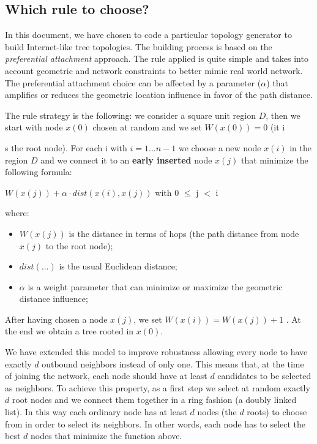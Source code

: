 \documentclass[a4paper,12pt]{article}
\begin{document}
\subsection{Which rule to choose?}
\label{sec:rule}

In this document, we have chosen to code a particular topology generator
to build Internet-like tree topologies. The building process is based
on the \emph{preferential attachment} approach. The rule applied is
quite simple and takes into account geometric and network constraints
to better mimic real world network. The preferential attachment choice
can be affected by a parameter ($ \alpha $) that amplifies or reduces the
geometric location influence in favor of the path distance. 

The rule strategy is the following: we consider a square unit region
$D$, then we start with node $x(0)$ chosen at random and we set $W(x(0))
= 0$ (it i

s the root node). For each i with $i = 1...n-1$ we choose a
new node $x(i)$ in the region $D$ and we connect it to an \textbf{early
inserted} node $x(j)$ that minimize the following formula:

\begin{center}
$W(x(j)) + \alpha \cdot dist(x(i), x(j))$ with 0 $\leq$ j $<$ i
\end{center}

where: 

\begin{itemize}
\item $W(x(j))$ is the distance in terms of hops (the path distance from node
$x(j)$ to the root node); 
\item $dist(...)$ is the usual Euclidean distance; 
\item $ \alpha $ is a weight parameter that can minimize or maximize 
the geometric distance influence;
 
\end{itemize}

After having chosen a node $x(j)$, we set $W(x(i)) = W(x(j))+1$ . At
the end we obtain a tree rooted in $x(0)$.

We have extended this model to improve robustness allowing every node
to have exactly $d$ outbound neighbors instead of only one. This means
that, at the time of joining the network, each node should have at
least $d$ candidates to be selected as neighbors. To achieve this property,
as a first step we select at random exactly $d$ root nodes and we connect
them together in a ring fashion (a doubly linked list). In this way
each ordinary node has at least $d$ nodes (the $d$ roots) to choose from
in order to select its neighbors. In other words, each node has to
select the best $d$ nodes that minimize the function above. 
\end{document}
